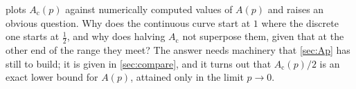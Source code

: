  plots $A_{\text{c}}(p)$ against numerically computed values of $A(p)$ and
raises an obvious question. Why does the continuous curve start at $1$ where the discrete
one starts at $\tfrac12$, and why does halving $A_{\text{c}}$ not superpose them, given
that at the other end of the range they meet? The answer needs machinery that
\cref{sec:Ap} has still to build; it is given in \cref{sec:compare}, and it turns out that
$A_{\text{c}}(p)/2$ is an exact lower bound for $A(p)$, attained only in the limit
$p\to0$.

\FloatBarrier
